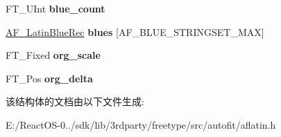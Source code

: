 \begin{DoxyCompactItemize}
F\+T\+\_\+\+U\+Int {\bfseries blue\+\_\+count}
\item 
\mbox{\label{struct_a_f___latin_axis_rec___a059bb47dbff0c76c97a2db7515e4ecd3}} 
\hyperlink{struct_a_f___latin_blue_rec__}{A\+F\+\_\+\+Latin\+Blue\+Rec} {\bfseries blues} \mbox{[}A\+F\+\_\+\+B\+L\+U\+E\+\_\+\+S\+T\+R\+I\+N\+G\+S\+E\+T\+\_\+\+M\+AX\mbox{]}
\item 
\mbox{\label{struct_a_f___latin_axis_rec___af10e9ef56fa7ab822cb0fa2018e8d274}} 
F\+T\+\_\+\+Fixed {\bfseries org\+\_\+scale}
\item 
\mbox{\label{struct_a_f___latin_axis_rec___ab9a5465753042f1ead45b9c404b5de7f}} 
F\+T\+\_\+\+Pos {\bfseries org\+\_\+delta}
\end{DoxyCompactItemize}


该结构体的文档由以下文件生成\+:\begin{DoxyCompactItemize}
\item 
E\+:/\+React\+O\+S-\/0../sdk/lib/3rdparty/freetype/src/autofit/aflatin.\+h\end{DoxyCompactItemize}
